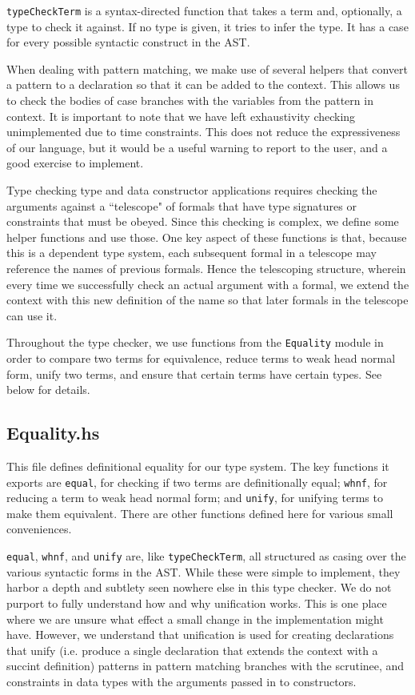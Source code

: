 \texttt{typeCheckTerm} is a syntax-directed function that takes a term and,
optionally, a type to check it against. If no type is given, it tries to infer
the type. It has a case for every possible syntactic construct in the AST.

When dealing with pattern matching, we make use of several helpers that convert
a pattern to a declaration so that it can be added to the context. This allows
us to check the bodies of case branches with the variables from the pattern in
context. It is important to note that we have left exhaustivity checking
unimplemented due to time constraints. This does not reduce the expressiveness
of our language, but it would be a useful warning to report to the user, and a
good exercise to implement.

Type checking type and data constructor applications requires checking the
arguments against a ``telescope" of formals that have type signatures or
constraints that must be obeyed. Since this checking is complex, we define some
helper functions and use those. One key aspect of these functions is that,
because this is a dependent type system, each subsequent formal in a telescope
may reference the names of previous formals. Hence the telescoping structure,
wherein every time we successfully check an actual argument with a formal, we
extend the context with this new definition of the name so that later formals
in the telescope can use it.

Throughout the type checker, we use functions from the \texttt{Equality} module
in order to compare two terms for equivalence, reduce terms to weak head normal
form, unify two terms, and ensure that certain terms have certain types. See
below for details.

\subsection{Equality.hs}\label{equal}
This file defines definitional equality for our type system. The key functions
it exports are \texttt{equal}, for checking if two terms are definitionally
equal; \texttt{whnf}, for reducing a term to weak head normal form; and
\texttt{unify}, for unifying terms to make them equivalent. There are other
functions defined here for various small conveniences.

\texttt{equal}, \texttt{whnf}, and \texttt{unify} are, like
\texttt{typeCheckTerm}, all structured as casing
over the various syntactic forms in the AST. While these were simple to
implement, they harbor a depth and subtlety seen nowhere else in this type
checker. We do not purport to fully understand how and why unification works.
This is one place where we are unsure what effect a small change in the
implementation might have. However, we understand that unification is used for
creating declarations that unify (i.e. produce a single declaration that
extends the context with a succint definition) patterns in pattern matching branches with
the scrutinee, and constraints in data types with the arguments passed in to
constructors.

